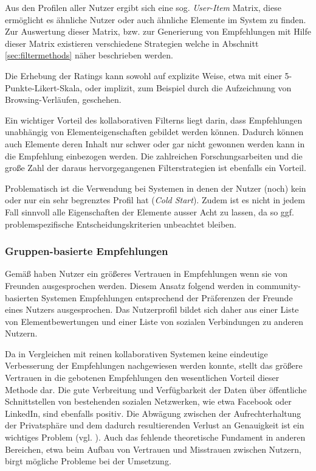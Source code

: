 Aus den Profilen aller Nutzer ergibt sich eine sog. \textit{User-Item} Matrix, diese ermöglicht es ähnliche Nutzer oder auch ähnliche Elemente im System zu finden. Zur Auswertung dieser Matrix, bzw. zur Generierung von Empfehlungen mit Hilfe dieser Matrix existieren verschiedene Strategien welche in Abschnitt \ref{sec:filtermethods} näher beschrieben werden.

Die Erhebung der Ratings kann sowohl auf explizite Weise, etwa mit einer 5-Punkte-Likert-Skala, oder implizit, zum Beispiel durch die Aufzeichnung von Browsing-Verläufen, geschehen.

Ein wichtiger Vorteil des kollaborativen Filterns liegt darin, dass Empfehlungen unabhängig von Elementeigenschaften gebildet werden können. Dadurch können auch Elemente deren Inhalt nur schwer oder gar nicht gewonnen werden kann in die Empfehlung einbezogen werden. Die zahlreichen Forschungsarbeiten und die große Zahl der daraus hervorgegangenen Filterstrategien ist ebenfalls ein Vorteil.

Problematisch ist die Verwendung bei Systemen in denen der Nutzer (noch) kein oder nur ein sehr begrenztes Profil hat (\textit{Cold Start}). Zudem ist es nicht in jedem Fall sinnvoll alle Eigenschaften der Elemente ausser Acht zu lassen, da so ggf. problemspezifische Entscheidungskriterien unbeachtet bleiben.  \citep{hb,Burke:2002:HRS:586321.586352} %

\subsubsection{Gruppen-basierte Empfehlungen}
Gemäß \citep{SinhaS01} haben Nutzer ein größeres Vertrauen in Empfehlungen wenn sie von Freunden ausgesprochen werden. Diesem Ansatz folgend werden in community-basierten Systemen Empfehlungen entsprechend der Präferenzen der Freunde eines Nutzers ausgesprochen. Das Nutzerprofil bildet sich daher aus einer Liste von Elementbewertungen und einer Liste von sozialen Verbindungen zu anderen Nutzern.

Da in Vergleichen mit reinen kollaborativen Systemen keine eindeutige Verbesserung der Empfehlungen nachgewiesen werden konnte, stellt das größere Vertrauen in die gebotenen Empfehlungen den wesentlichen Vorteil dieser Methode dar. Die gute Verbreitung und Verfügbarkeit der Daten über öffentliche Schnittstellen von  bestehenden sozialen Netzwerken, wie etwa Facebook oder LinkedIn, sind ebenfalls positiv. Die Abwägung zwischen der Aufrechterhaltung der Privatsphäre und dem dadurch resultierenden Verlust an Genauigkeit ist ein wichtiges Problem (vgl. \citep{machanavajjhala:accurate}). Auch das fehlende theoretische Fundament in anderen Bereichen, etwa beim Aufbau von Vertrauen und Misstrauen zwischen Nutzern, birgt mögliche Probleme bei der Umsetzung. \citep{hb_20}

